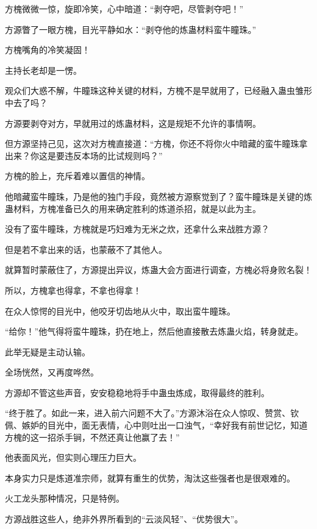 \begin{this_body}
方槐微微一惊，旋即冷笑，心中暗道：“剥夺吧，尽管剥夺吧！”

方源瞥了一眼方槐，目光平静如水：“剥夺他的炼蛊材料蛮牛瞳珠。”

方槐嘴角的冷笑凝固！

主持长老却是一愣。

观众们大惑不解，牛瞳珠这种关键的材料，方槐不是早就用了，已经融入蛊虫雏形中去了吗？

方源要剥夺对方，早就用过的炼蛊材料，这是规矩不允许的事情啊。

但方源坚持己见，这次对方槐直接道：“方槐，你还不将你火中暗藏的蛮牛瞳珠拿出来？你这是要违反本场的比试规则吗？”

方槐的脸上，充斥着难以置信的神情。

他暗藏蛮牛瞳珠，乃是他的独门手段，竟然被方源察觉到了？蛮牛瞳珠是关键的炼蛊材料，方槐准备已久的用来确定胜利的炼道杀招，就是以此为主。

没有了蛮牛瞳珠，方槐就是巧妇难为无米之炊，还拿什么来战胜方源？

但是若不拿出来的话，也蒙蔽不了其他人。

就算暂时蒙蔽住了，方源提出异议，炼蛊大会方面进行调查，方槐必将身败名裂！

所以，方槐拿也得拿，不拿也得拿！

在众人惊愕的目光中，他咬牙切齿地从火中，取出蛮牛瞳珠。

“给你！”他气得将蛮牛瞳珠，扔在地上，然后他直接散去炼蛊火焰，转身就走。

此举无疑是主动认输。

全场恍然，又再度哗然。

方源却不管这些声音，安安稳稳地将手中蛊虫炼成，取得最终的胜利。

“终于胜了。如此一来，进入前六问题不大了。”方源沐浴在众人惊叹、赞赏、钦佩、嫉妒的目光中，面无表情，心中则吐出一口浊气，“幸好我有前世记忆，知道方槐的这一招杀手锏，不然还真让他赢了去！”

他表面风光，但实则心理压力巨大。

本身实力只是炼道准宗师，就算有重生的优势，淘汰这些强者也是很艰难的。

火工龙头那种情况，只是特例。

方源战胜这些人，绝非外界所看到的“云淡风轻”、“优势很大”。

\end{this_body}

